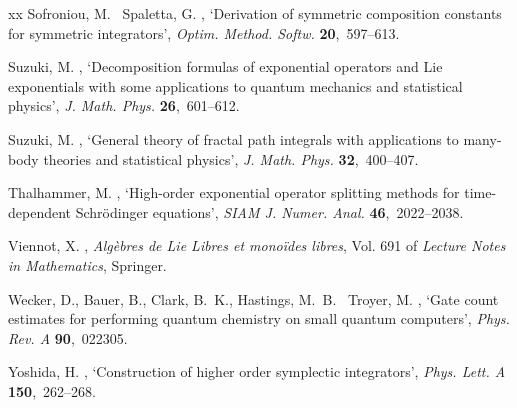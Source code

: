 \documentclass[11pt]{article}
\begin{document}
\begin{thebibliography}{xx}
Sofroniou, M. \harvardand\ Spaletta, G.  \harvardyearright
  , `Derivation of symmetric composition constants for symmetric integrators',
  {\em Optim. Method. Softw.} {\bf 20},~597--613.

Suzuki, M.  \harvardyearright , `Decomposition formulas of
  exponential operators and {L}ie exponentials with some applications to
  quantum mechanics and statistical physics', {\em J. Math. Phys.} {\bf
  26},~601--612.

Suzuki, M.  \harvardyearright , `General theory of fractal
  path integrals with applications to many-body theories and statistical
  physics', {\em J. Math. Phys.} {\bf 32},~400--407.

Thalhammer, M.  \harvardyearright , `High-order
  exponential operator splitting methods for time-dependent {S}chr\"odinger
  equations', {\em SIAM J. Numer. Anal.} {\bf 46},~2022--2038.

Viennot, X.  \harvardyearright , {\em Alg\`ebres de {L}ie
  {L}ibres et mono\"ides libres}, Vol. 691 of {\em {L}ecture {N}otes in
  {M}athematics}, Springer.

Wecker, D., Bauer, B., Clark, B.~K., Hastings, M.~B. \harvardand\ Troyer, M.
  \harvardyearleft 2014\harvardyearright , `Gate count estimates for performing
  quantum chemistry on small quantum computers', {\em Phys. Rev. A} {\bf
  90},~022305.

Yoshida, H.  \harvardyearright , `Construction of higher
  order symplectic integrators', {\em Phys. Lett. A} {\bf 150},~262--268.

\end{thebibliography}
\end{document}
